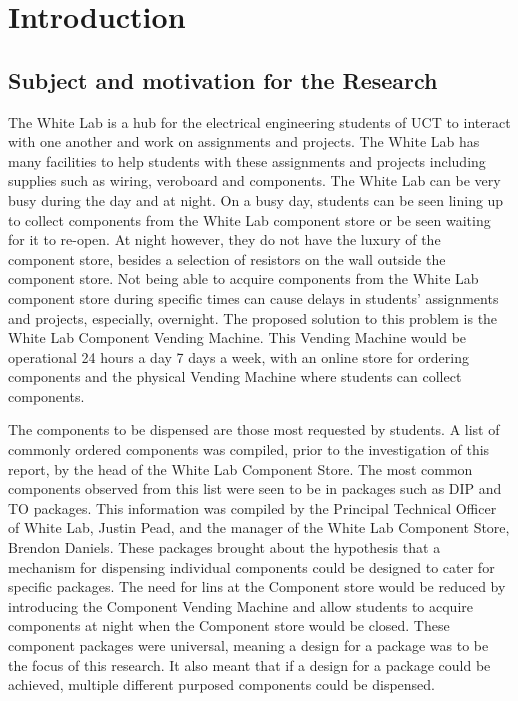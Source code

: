 \documentclass[a4paper,11pt]{article}
\numberwithin{figure}{section}
\numberwithin{table}{section}
\begin{document}
	
	
	
		
	\newpage
	
	\newpage
	\newpage
	
\pagestyle{mypage}
\section{Introduction}\thispagestyle{sectionstart}
	\subsection{Subject and motivation for the Research}
The White Lab is a hub for the electrical engineering students of UCT to interact with one another and work on assignments and projects. The White Lab has many facilities to help students with these assignments and projects including supplies such as wiring, veroboard and components. The White Lab can be very busy during the day and at night. On a busy day, students can be seen lining up to collect components from the White Lab component store or be seen waiting for it to re-open. At night however, they do not have the luxury of the component store, besides a selection of resistors on the wall outside the component store. Not being able to acquire components from the White Lab component store during specific times can cause delays in students' assignments and projects, especially, overnight. The proposed solution to this problem is the White Lab Component Vending Machine. This Vending Machine would be operational 24 hours a day 7 days a week, with an online store for ordering components and the physical Vending Machine where students can collect components. 

The components to be dispensed are those most requested by students. A list of commonly ordered components was compiled, prior to the investigation of this report, by the head of the White Lab Component Store. The most common components observed from this list were seen to be in packages such as DIP and TO packages. This information was compiled by the Principal Technical Officer of White Lab, Justin Pead, and the manager of the White Lab Component Store, Brendon Daniels. These packages brought about the hypothesis that a mechanism for dispensing individual components could be designed to cater for specific packages. The need for lins at the Component store would be reduced by introducing the Component Vending Machine and allow students to acquire components at night when the Component store would be closed. These component packages were universal, meaning a design for a package was to be the focus of this research. It also meant that if a design for a package could be achieved, multiple different purposed components could be dispensed.
\end{document}
